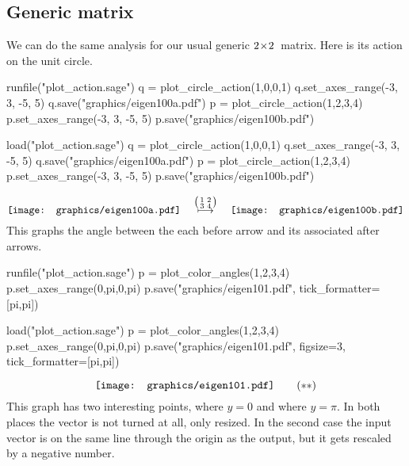 \subsection{Generic matrix}
We can do the same analysis for our usual generic $2 \! \times \! 2$~matrix.
Here is its action on the unit circle.
\begin{sageoutput}[d,0,4;d,5,7]
runfile("plot_action.sage")
q = plot_circle_action(1,0,0,1) 
q.set_axes_range(-3, 3, -5, 5) 
q.save("graphics/eigen100a.pdf")
p = plot_circle_action(1,2,3,4) 
p.set_axes_range(-3, 3, -5, 5) 
p.save("graphics/eigen100b.pdf")
\end{sageoutput}
\begin{sagesilent}
load("plot_action.sage")
q = plot_circle_action(1,0,0,1) 
q.set_axes_range(-3, 3, -5, 5) 
q.save("graphics/eigen100a.pdf")
p = plot_circle_action(1,2,3,4) 
p.set_axes_range(-3, 3, -5, 5) 
p.save("graphics/eigen100b.pdf")
\end{sagesilent}
\begin{equation*}
  \vcenteredhbox{\texttt{[image: graphics/eigen100a.pdf]}}
  \quad\mapsunder{\big (\begin{smallmatrix} 1 &2 \\ 3 &4 \end{smallmatrix}\big )}\quad
  \vcenteredhbox{\texttt{[image: graphics/eigen100b.pdf]}}
\end{equation*}
This graphs the angle between the each before arrow and its associated after
arrows.
\begin{sageoutput}[d,0,1]
runfile("plot_action.sage")  
p = plot_color_angles(1,2,3,4)
p.set_axes_range(0,pi,0,pi)
p.save("graphics/eigen101.pdf", tick_formatter=[pi,pi])
\end{sageoutput}
\begin{sagesilent}
load("plot_action.sage")  
p = plot_color_angles(1,2,3,4)
p.set_axes_range(0,pi,0,pi)
p.save("graphics/eigen101.pdf", figsize=3, tick_formatter=[pi,pi])
\end{sagesilent}
\begin{equation*}
  \vcenteredhbox{\texttt{[image: graphics/eigen101.pdf]}}
  \tag{$**$}
\end{equation*}
This graph has two interesting points, where $y=0$ and where 
$y=\pi$.
In both places the vector is not turned at all, only resized.
In the second case
the input vector is on the
same line through the origin as the output,
but it gets rescaled by a negative number.

